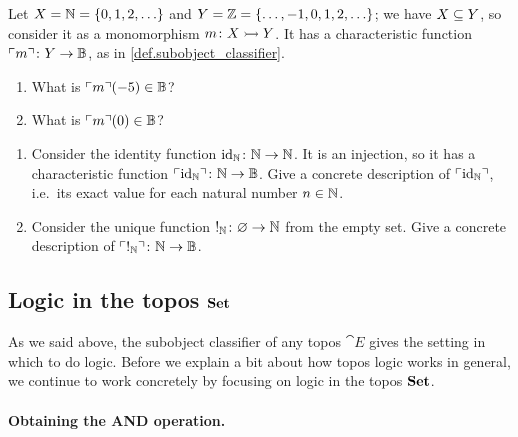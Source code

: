 \documentclass[7Sketches]{subfiles}
\begin{document}
\begin{exercise}%
\label{exc.characteristic_practice}
  Let $X=\NN=\{0,1,2,\ldots\}$ and $Y=\ZZ=\{\ldots,-1,0,1,2,\ldots\}$; we have
  $X\ss Y$, so consider it as a monomorphism $m\colon X\inj Y$. It has a
  characteristic function $\corners{m}\colon Y\to\BB$, as in
  \cref{def.subobject_classifier}.
  \begin{enumerate}
    \item What is $\corners{m}(-5)\in\BB$?
    \item What is $\corners{m}(0)\in\BB$?
  \qedhere
\end{enumerate}
\end{exercise}


\begin{exercise}%
\label{exc.simple_char_funs}
  \begin{enumerate}
    \item Consider the identity function $\id_\NN\colon \NN\to \NN$. It is an
      injection, so it has a characteristic function $\corners{\id_\NN}\colon
      \NN\to\BB$.  Give a concrete description of $\corners{\id_\NN}$, i.e.\ its
      exact value for each natural number $n\in\NN$.
    \item Consider the unique function $!_\NN\colon\varnothing\to\NN$ from the
      empty set. Give a concrete description of $\corners{!_\NN}\colon\nn\to\bb$.
  \qedhere
\end{enumerate}
\end{exercise}

%
%


\subsection{Logic in the topos $\smset$}%
\label{subsubsec.logic_set}%

As we said above, the subobject classifier of any topos $\cat{E}$ gives the setting in which to do logic. Before we explain a bit about how topos logic works in general, we continue to work concretely by focusing on logic in the topos $\smset$.%

\paragraph{Obtaining the AND operation.}%
\end{document}
